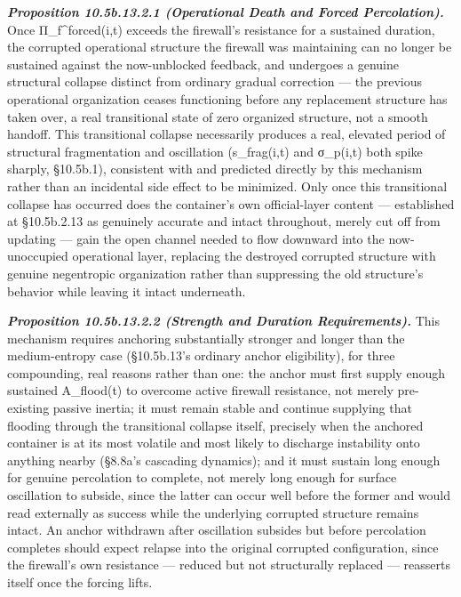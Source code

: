 \documentclass[
]{article}
\begin{document}
\emph{\textbf{Proposition 10.5b.13.2.1 (Operational Death and Forced
Percolation).}} Once Π\_f\^{}forced(i,t) exceeds the firewall's
resistance for a sustained duration, the corrupted operational structure
the firewall was maintaining can no longer be sustained against the
now-unblocked feedback, and undergoes a genuine structural collapse
distinct from ordinary gradual correction --- the previous operational
organization ceases functioning before any replacement structure has
taken over, a real transitional state of zero organized structure, not a
smooth handoff. This transitional collapse necessarily produces a real,
elevated period of structural fragmentation and oscillation
(s\_frag(i,t) and σ\_p(i,t) both spike sharply, §10.5b.1), consistent
with and predicted directly by this mechanism rather than an incidental
side effect to be minimized. Only once this transitional collapse has
occurred does the container's own official-layer content --- established
at §10.5b.2.13 as genuinely accurate and intact throughout, merely cut
off from updating --- gain the open channel needed to flow downward into
the now-unoccupied operational layer, replacing the destroyed corrupted
structure with genuine negentropic organization rather than suppressing
the old structure's behavior while leaving it intact underneath.

\emph{\textbf{Proposition 10.5b.13.2.2 (Strength and Duration
Requirements).}} This mechanism requires anchoring substantially
stronger and longer than the medium-entropy case (§10.5b.13's ordinary
anchor eligibility), for three compounding, real reasons rather than
one: the anchor must first supply enough sustained A\_flood(t) to
overcome active firewall resistance, not merely pre-existing passive
inertia; it must remain stable and continue supplying that flooding
through the transitional collapse itself, precisely when the anchored
container is at its most volatile and most likely to discharge
instability onto anything nearby (§8.8a's cascading dynamics); and it
must sustain long enough for genuine percolation to complete, not merely
long enough for surface oscillation to subside, since the latter can
occur well before the former and would read externally as success while
the underlying corrupted structure remains intact. An anchor withdrawn
after oscillation subsides but before percolation completes should
expect relapse into the original corrupted configuration, since the
firewall's own resistance --- reduced but not structurally replaced ---
reasserts itself once the forcing lifts.
\end{document}
